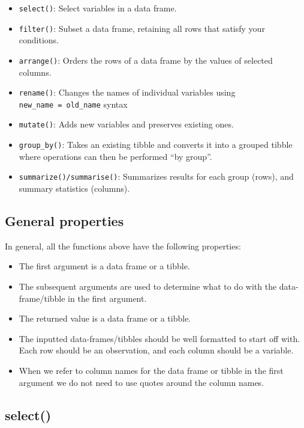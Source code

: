 \documentclass[
]{book}
\begin{document}
\begin{itemize}
\item
  \texttt{select()}: Select variables in a data frame.
\item
  \texttt{filter()}: Subset a data frame, retaining all rows that satisfy your conditions.
\item
  \texttt{arrange()}: Orders the rows of a data frame by the values of selected columns.
\item
  \texttt{rename()}: Changes the names of individual variables using \texttt{new\_name\ =\ old\_name} syntax
\item
  \texttt{mutate()}: Adds new variables and preserves existing ones.
\item
  \texttt{group\_by()}: Takes an existing tibble and converts it into a grouped tibble where operations can then be performed ``by group''.
\item
  \texttt{summarize()/summarise()}: Summarizes results for each group (rows), and summary statistics (columns).
\end{itemize}

\hypertarget{general-properties}{%
\subsection{General properties}\label{general-properties}}

In general, all the functions above have the following properties:

\begin{itemize}
\item
  The first argument is a data frame or a tibble.
\item
  The subsequent arguments are used to determine what to do with the data-frame/tibble in the first argument.
\item
  The returned value is a data frame or a tibble.
\item
  The inputted data-frames/tibbles should be well formatted to start off with. Each row should be an observation, and each column should be a variable.
\item
  When we refer to column names for the data frame or tibble in the first argument we do not need to use quotes around the column names.
\end{itemize}

\hypertarget{select}{%
\subsection{select()}\label{select}}
\end{document}
